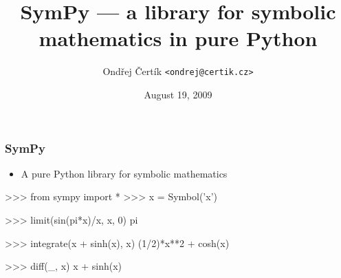 \documentclass[handout]{beamer}
\title{SymPy --- a library for symbolic mathematics \linebreak in pure Python}
\author{Ondřej Čertík \texttt{<ondrej@certik.cz>}}
\institute[PWR]{University of Nevada, Reno\linebreak SymPy Development Team}
\date{August 19, 2009}
\begin{document}

\frame{\titlepage}

\begin{frame}[fragile]
    \frametitle{SymPy}

    \begin{itemize}
        \item A pure Python library for symbolic mathematics
    \end{itemize}

    \begin{python}
  >>> from sympy import *
  >>> x = Symbol('x')

  >>> limit(sin(pi*x)/x, x, 0)
  pi

  >>> integrate(x + sinh(x), x)
  (1/2)*x**2 + cosh(x)

  >>> diff(_, x)
  x + sinh(x)
    \end{python}
\end{frame}
\end{document}
